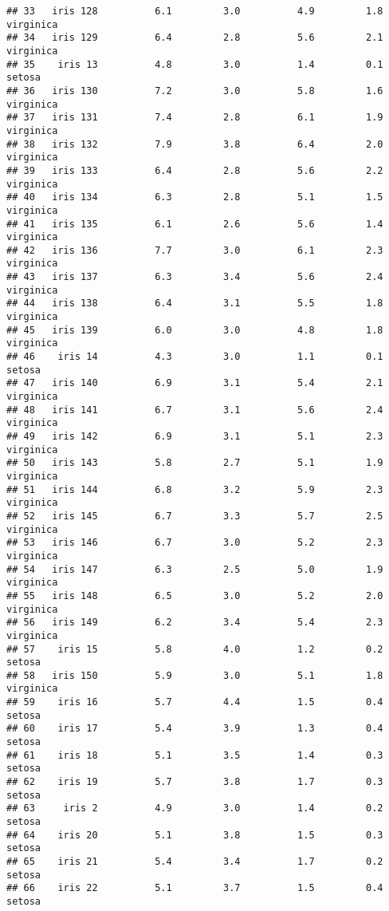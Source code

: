 \documentclass[
]{article}
\begin{document}
\begin{verbatim}
## 33   iris 128          6.1         3.0          4.9         1.8  virginica
## 34   iris 129          6.4         2.8          5.6         2.1  virginica
## 35    iris 13          4.8         3.0          1.4         0.1     setosa
## 36   iris 130          7.2         3.0          5.8         1.6  virginica
## 37   iris 131          7.4         2.8          6.1         1.9  virginica
## 38   iris 132          7.9         3.8          6.4         2.0  virginica
## 39   iris 133          6.4         2.8          5.6         2.2  virginica
## 40   iris 134          6.3         2.8          5.1         1.5  virginica
## 41   iris 135          6.1         2.6          5.6         1.4  virginica
## 42   iris 136          7.7         3.0          6.1         2.3  virginica
## 43   iris 137          6.3         3.4          5.6         2.4  virginica
## 44   iris 138          6.4         3.1          5.5         1.8  virginica
## 45   iris 139          6.0         3.0          4.8         1.8  virginica
## 46    iris 14          4.3         3.0          1.1         0.1     setosa
## 47   iris 140          6.9         3.1          5.4         2.1  virginica
## 48   iris 141          6.7         3.1          5.6         2.4  virginica
## 49   iris 142          6.9         3.1          5.1         2.3  virginica
## 50   iris 143          5.8         2.7          5.1         1.9  virginica
## 51   iris 144          6.8         3.2          5.9         2.3  virginica
## 52   iris 145          6.7         3.3          5.7         2.5  virginica
## 53   iris 146          6.7         3.0          5.2         2.3  virginica
## 54   iris 147          6.3         2.5          5.0         1.9  virginica
## 55   iris 148          6.5         3.0          5.2         2.0  virginica
## 56   iris 149          6.2         3.4          5.4         2.3  virginica
## 57    iris 15          5.8         4.0          1.2         0.2     setosa
## 58   iris 150          5.9         3.0          5.1         1.8  virginica
## 59    iris 16          5.7         4.4          1.5         0.4     setosa
## 60    iris 17          5.4         3.9          1.3         0.4     setosa
## 61    iris 18          5.1         3.5          1.4         0.3     setosa
## 62    iris 19          5.7         3.8          1.7         0.3     setosa
## 63     iris 2          4.9         3.0          1.4         0.2     setosa
## 64    iris 20          5.1         3.8          1.5         0.3     setosa
## 65    iris 21          5.4         3.4          1.7         0.2     setosa
## 66    iris 22          5.1         3.7          1.5         0.4     setosa

\end{verbatim}
\end{document}
